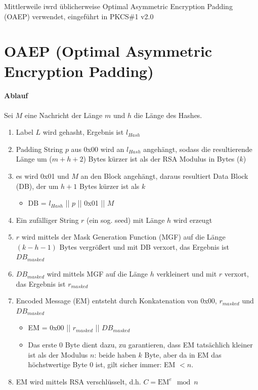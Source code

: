 Mittlerweile iwrd üblicherweise Optimal Asymmetric Encryption Padding (OAEP) verwendet, eingeführt in PKCS\#1 v2.0

\section{OAEP (Optimal Asymmetric Encryption Padding)}

\paragraph{Ablauf}

Sei $M$ eine Nachricht der Länge $m$ und $h$ die Länge des Hashes.

\begin{enumerate}
    \item Label $L$ wird gehasht, Ergebnis ist $l_{Hash}$
    \item Padding String $p$ aus 0x00 wird an $l_{Hash}$ angehängt, sodass die resultierende Länge um ($m + h + 2$) Bytes kürzer ist als der RSA Modulus in Bytes ($k$)
    \item es wird 0x01 und $M$ an den Block angehängt, daraus resultiert Data Block (DB), der um $h+1$ Bytes kürzer ist als $k$
    \begin{itemize}
        \item DB = $l_{Hash}$ || $p$ || 0x01 || $M$
    \end{itemize}
    \item Ein zufälliger String $r$ (ein sog. seed) mit Länge $h$ wird erzeugt
    \item $r$ wird mittels der Mask Generation Function (MGF) auf die Länge $(k - h - 1)$ Bytes vergrößert und mit DB verxort, das Ergebnis ist $DB_{masked}$
    \item $DB_{masked}$ wird mittels MGF auf die Länge $h$ verkleinert und mit $r$ verxort, das Ergebnis ist $r_{masked}$
    \item Encoded Message (EM) entsteht durch Konkatenation von 0x00, $r_{masked}$ und $DB_{masked}$
    \begin{itemize}
        \item EM = 0x00 || $r_{masked}$ || $DB_{masked}$
        \item Das erste 0 Byte dient dazu, zu garantieren, dass EM tatsächlich kleiner ist als der Modulus $n$: beide haben $k$ Byte, aber da in EM das höchstwertige Byte 
        0 ist, gilt sicher immer: EM $< n$.
    \end{itemize}
    \item EM wird mittels RSA verschlüsselt, d.h. $C = \text{EM}^e \mod n$
\end{enumerate}

